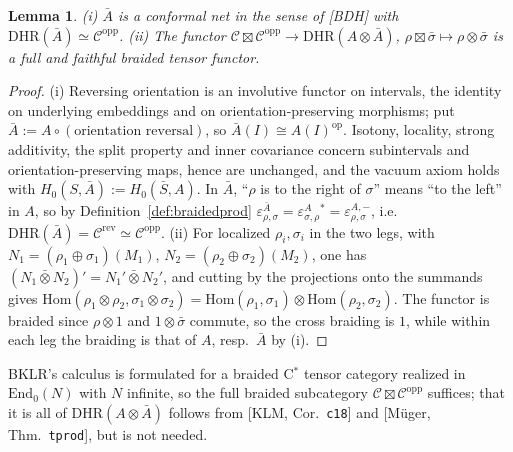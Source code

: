 \documentclass[11pt]{article}
\newtheorem{lemma}[theorem]{Lemma}
\theoremstyle{definition}
\theoremstyle{remark}
\begin{document}
\begin{lemma}\label{lem:conjnet}
(i) $\bar A$ is a conformal net in the sense of [BDH] with $\mathrm{DHR}(\bar A)\simeq\mathcal C^{\mathrm{opp}}$. (ii) The functor $\mathcal C\boxtimes\mathcal C^{\mathrm{opp}}\to\mathrm{DHR}(A\otimes\bar A)$, $\rho\boxtimes\bar\sigma\mapsto\rho\otimes\bar\sigma$ is a full and faithful braided tensor functor.
\end{lemma}
\begin{proof}
(i) Reversing orientation is an involutive functor on intervals, the identity on underlying embeddings and on orientation-preserving morphisms; put $\bar A:=A\circ(\text{orientation reversal})$, so $\bar A(I)\cong A(I)^{\mathrm{op}}$. Isotony, locality, strong additivity, the split property and inner covariance concern subintervals and orientation-preserving maps, hence are unchanged, and the vacuum axiom holds with $H_0(S,\bar A):=H_0(\bar S,A)$. In $\bar A$, ``$\rho$ is to the right of $\sigma$'' means ``to the left'' in $A$, so by Definition~\ref{def:braidedprod} $\varepsilon^{\bar A}_{\rho,\sigma}=\varepsilon^{A}_{\sigma,\rho}{}^*=\varepsilon^{A,-}_{\rho,\sigma}$, i.e.\ $\mathrm{DHR}(\bar A)=\mathcal C^{\mathrm{rev}}\simeq\mathcal C^{\mathrm{opp}}$. (ii) For localized $\rho_i,\sigma_i$ in the two legs, with $N_1=(\rho_1\oplus\sigma_1)(M_1)$, $N_2=(\rho_2\oplus\sigma_2)(M_2)$, one has $(N_1\bar\otimes N_2)'=N_1'\bar\otimes N_2'$, and cutting by the projections onto the summands gives $\mathrm{Hom}(\rho_1\otimes\rho_2,\sigma_1\otimes\sigma_2)=\mathrm{Hom}(\rho_1,\sigma_1)\otimes\mathrm{Hom}(\rho_2,\sigma_2)$. The functor is braided since $\rho\otimes1$ and $1\otimes\bar\sigma$ commute, so the cross braiding is $1$, while within each leg the braiding is that of $A$, resp.\ $\bar A$ by (i).
\end{proof}
BKLR's calculus is formulated for a braided C$^*$ tensor category realized in $\mathrm{End}_0(N)$ with $N$ infinite, so the full braided subcategory $\mathcal C\boxtimes\mathcal C^{\mathrm{opp}}$ suffices; that it is all of $\mathrm{DHR}(A\otimes\bar A)$ follows from [KLM, Cor.~\texttt{c18}] and [M\"uger, Thm.~\texttt{tprod}], but is not needed.
\end{document}
